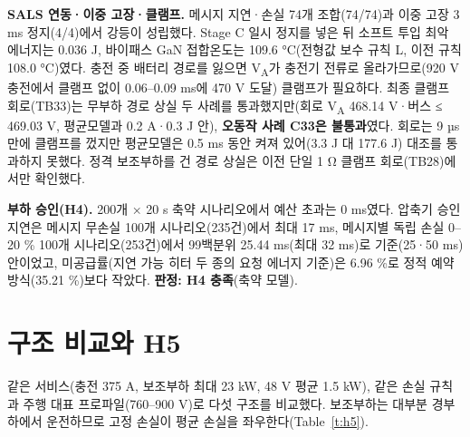 \textbf{SALS 연동·이중 고장·클램프.} 메시지 지연·손실 74개 조합(74/74)과 이중 고장 3 ms 정지(4/4)에서 강등이 성립했다. Stage C 일시 정지를 넣은 뒤 소프트 투입 최악 에너지는 0.036 J, 바이패스 GaN 접합온도는 109.6 °C(전형값 보수 규칙 L, 이전 규칙 108.0 °C)였다. 충전 중 배터리 경로를 잃으면 V\textsubscript{A}가 충전기 전류로 올라가므로(920 V 충전에서 클램프 없이 0.06–0.09 ms에 470 V 도달) 클램프가 필요하다. 최종 클램프 회로(TB33)는 무부하 경로 상실 두 사례를 통과했지만(회로 V\textsubscript{A} 468.14 V·버스 ≤ 469.03 V, 평균모델과 0.2 A·0.3 J 안), \textbf{오동작 사례 C33은 불통과}였다. 회로는 9 µs 만에 클램프를 껐지만 평균모델은 0.5 ms 동안 켜져 있어(3.3 J 대 177.6 J) 대조를 통과하지 못했다. 정격 보조부하를 건 경로 상실은 이전 단일 1 Ω 클램프 회로(TB28)에서만 확인했다.

\textbf{부하 승인(H4).} 200개 × 20 s 축약 시나리오에서 예산 초과는 0 ms였다. 압축기 승인 지연은 메시지 무손실 100개 시나리오(235건)에서 최대 17 ms, 메시지별 독립 손실 0–20 \% 100개 시나리오(253건)에서 99백분위 25.44 ms(최대 32 ms)로 기준(25·50 ms) 안이었고, 미공급률(지연 가능 히터 두 종의 요청 에너지 기준)은 6.96 \%로 정적 예약 방식(35.21 \%)보다 작았다. \textbf{판정: H4 충족}(축약 모델).

\section{구조 비교와 H5}\label{s:h5}

같은 서비스(충전 375 A, 보조부하 최대 23 kW, 48 V 평균 1.5 kW), 같은 손실 규칙과 주행 대표 프로파일(760–900 V)로 다섯 구조를 비교했다. 보조부하는 대부분 경부하에서 운전하므로 고정 손실이 평균 손실을 좌우한다\cite{b11}(Table~\ref{t:h5}).

